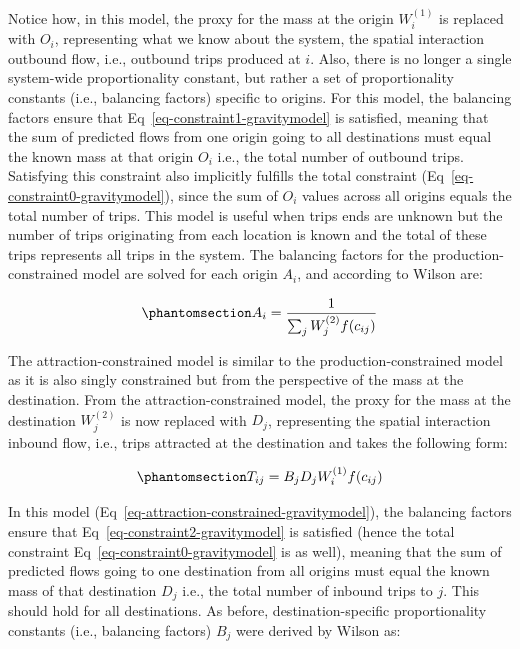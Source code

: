 \documentclass[
  10pt,
  letterpaper,
]{article}
\begin{document}
Notice how, in this model, the proxy for the mass at the origin
\(W_i^{(1)}\) is replaced with \(O_i\), representing what we know about
the system, the spatial interaction outbound flow, i.e., outbound trips
produced at \(i\). Also, there is no longer a single system-wide
proportionality constant, but rather a set of proportionality constants
(i.e., balancing factors) specific to origins. For this model, the
balancing factors ensure that Eq~\ref{eq-constraint1-gravitymodel} is
satisfied, meaning that the sum of predicted flows from one origin going
to all destinations must equal the known mass at that origin \(O_i\)
i.e., the total number of outbound trips. Satisfying this constraint
also implicitly fulfills the total constraint
(Eq~\ref{eq-constraint0-gravitymodel}), since the sum of \(O_i\) values
across all origins equals the total number of trips. This model is
useful when trips ends are unknown but the number of trips originating
from each location is known and the total of these trips represents all
trips in the system. The balancing factors for the
production-constrained model are solved for each origin \(A_i\), and
according to Wilson are:

\begin{equation}\phantomsection\label{eq-production-constrained-balancing-factor}{
A_i = \frac{1}{\sum_j W_j^{(2)} f(c_{ij})}
}\end{equation}

The attraction-constrained model is similar to the
production-constrained model as it is also singly constrained but from
the perspective of the mass at the destination. From the
attraction-constrained model, the proxy for the mass at the destination
\(W_j^{(2)}\) is now replaced with \(D_j\), representing the spatial
interaction inbound flow, i.e., trips attracted at the destination and
takes the following form:

\begin{equation}\phantomsection\label{eq-attraction-constrained-gravitymodel}{
T_{ij} = B_j D_j W_i^{(1)} f(c_{ij})
}\end{equation}

In this model (Eq~\ref{eq-attraction-constrained-gravitymodel}), the
balancing factors ensure that Eq~\ref{eq-constraint2-gravitymodel} is
satisfied (hence the total constraint
Eq~\ref{eq-constraint0-gravitymodel} is as well), meaning that the sum
of predicted flows going to one destination from all origins must equal
the known mass of that destination \(D_j\) i.e., the total number of
inbound trips to \(j\). This should hold for all destinations. As
before, destination-specific proportionality constants (i.e., balancing
factors) \(B_j\) were derived by Wilson as:
\end{document}
